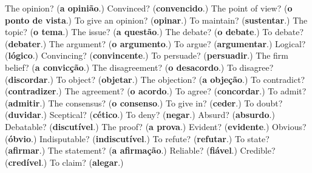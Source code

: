 \begin{tcolorbox}[breakable,colback=teal!4,colframe=teal!35!black,title={Before you move on}]
The opinion? (\textbf{a opinião}.) Convinced? (\textbf{convencido}.) The point of view? (\textbf{o ponto de vista}.) To give an opinion? (\textbf{opinar}.) To maintain? (\textbf{sustentar}.) The topic? (\textbf{o tema}.) The issue? (\textbf{a questão}.) The debate? (\textbf{o debate}.) To debate? (\textbf{debater}.) The argument? (\textbf{o argumento}.) To argue? (\textbf{argumentar}.) Logical? (\textbf{lógico}.) Convincing? (\textbf{convincente}.) To persuade? (\textbf{persuadir}.) The firm belief? (\textbf{a convicção}.) The disagreement? (\textbf{o desacordo}.) To disagree? (\textbf{discordar}.) To object? (\textbf{objetar}.) The objection? (\textbf{a objeção}.) To contradict? (\textbf{contradizer}.) The agreement? (\textbf{o acordo}.) To agree? (\textbf{concordar}.) To admit? (\textbf{admitir}.) The consensus? (\textbf{o consenso}.) To give in? (\textbf{ceder}.) To doubt? (\textbf{duvidar}.) Sceptical? (\textbf{cético}.) To deny? (\textbf{negar}.) Absurd? (\textbf{absurdo}.) Debatable? (\textbf{discutível}.) The proof? (\textbf{a prova}.) Evident? (\textbf{evidente}.) Obvious? (\textbf{óbvio}.) Indisputable? (\textbf{indiscutível}.) To refute? (\textbf{refutar}.) To state? (\textbf{afirmar}.) The statement? (\textbf{a afirmação}.) Reliable? (\textbf{fiável}.) Credible? (\textbf{credível}.) To claim? (\textbf{alegar}.)
\end{tcolorbox}
